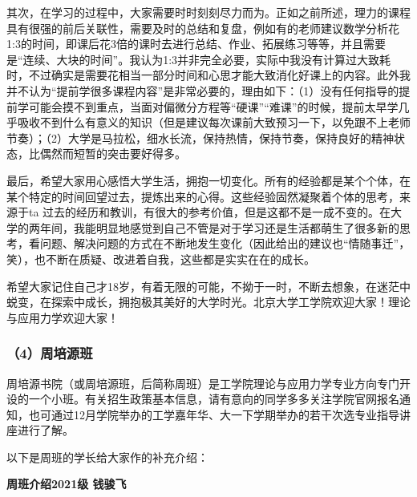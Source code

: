 \vspace{10pt}

其次，在学习的过程中，大家需要时时刻刻尽力而为。正如之前所述，理力的课程具有很强的前后关联性，需要及时的总结和复盘，例如有的老师建议数学分析花1:3的时间，即课后花3倍的课时去进行总结、作业、拓展练习等等，并且需要是“连续、大块的时间”。我认为1:3并非完全必要，实际中我没有计算过大致耗时，不过确实是需要花相当一部分时间和心思才能大致消化好课上的内容。此外我并不认为“提前学很多课程内容”是非常必要的，理由如下：（1）没有任何指导的提前学可能会摸不到重点，当面对偏微分方程等“硬课”“难课”的时候，提前太早学几乎吸收不到什么有意义的知识（但是建议每次课前大致预习一下，以免跟不上老师节奏）；（2）大学是马拉松，细水长流，保持热情，保持节奏，保持良好的精神状态，比偶然而短暂的突击要好得多。

\vspace{10pt}

最后，希望大家用心感悟大学生活，拥抱一切变化。所有的经验都是某个个体，在某个特定的时间回望过去，提炼出来的心得。这些经验固然凝聚着个体的思考，来源于ta 过去的经历和教训，有很大的参考价值，但是这都不是一成不变的。在大学的两年间，我能明显地感觉到自己不管是对于学习还是生活都萌生了很多新的思考，看问题、解决问题的方式在不断地发生变化（因此给出的建议也“情随事迁”，笑），也不断在质疑、改进着自我，这些都是实实在在的成长。

\vspace{10pt}

希望大家记住自己才18岁，有着无限的可能，不拗于一时，不断去想象，在迷茫中蜕变，在探索中成长，拥抱极其美好的大学时光。北京大学工学院欢迎大家！理论与应用力学欢迎大家！

\vspace{10pt}

\subsubsection{（4）周培源班}

周培源书院（或周培源班，后简称周班）是工学院理论与应用力学专业方向专门开设的一个小班。有关招生政策基本信息，请有意向的同学多多关注学院官网报名通知，也可通过12月学院举办的工学嘉年华、大一下学期举办的若干次选专业指导讲座进行了解。

\vspace{10pt}

以下是周班的学长给大家作的补充介绍：

\textbf{周班介绍\quad 2021级 钱骏飞}

\vspace{10pt}

